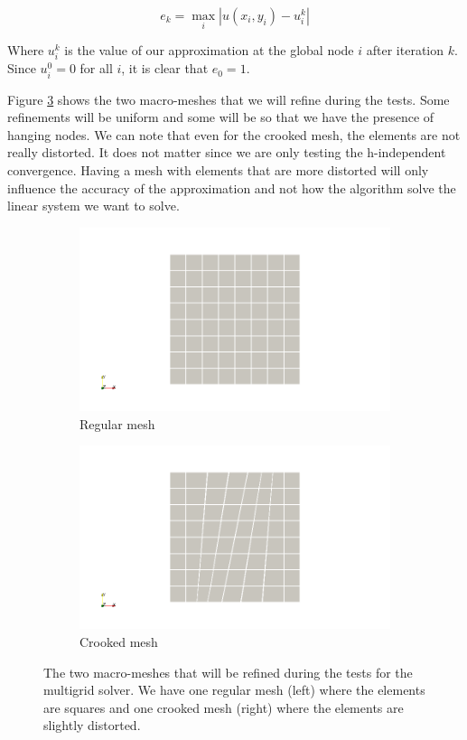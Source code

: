 $$e_k = \max_i |u(x_i,y_i) - u_i^k|$$

Where $u_i^k$ is the value of our approximation at the global node $i$ after iteration $k$. Since $u_i^0 = 0$ for all $i$, it is clear that $e_0 = 1$.

Figure \ref{multi_mesh} shows the two macro-meshes that we will refine during the tests. Some refinements will be uniform and some will be so that we have the presence of hanging nodes. We can note that even for the crooked mesh, the elements are not really distorted. It does not matter since we are only testing the h-independent convergence. Having a mesh with elements that are more distorted will only influence the accuracy of the approximation and not how the algorithm solve the linear system we want to solve. 

\begin{figure}
\centering
\begin{subfigure}{.5\textwidth}
  \centering
  \includegraphics[width=1.2\linewidth]{Results/multi_mesh_1.png}
  \caption{Regular mesh}
  \label{multi_mesh_1}
\end{subfigure}%
\begin{subfigure}{.5\textwidth}
  \centering
  \includegraphics[width=1.2\linewidth]{Results/multi_mesh_2.png}
  \caption{Crooked mesh}
  \label{multi_mesh_2}
\end{subfigure}
\caption{The two macro-meshes that will be refined during the tests for the multigrid solver. We have one regular mesh (left) where the elements are squares and one crooked mesh (right) where the elements are slightly distorted.}
\label{multi_mesh}
\end{figure}



